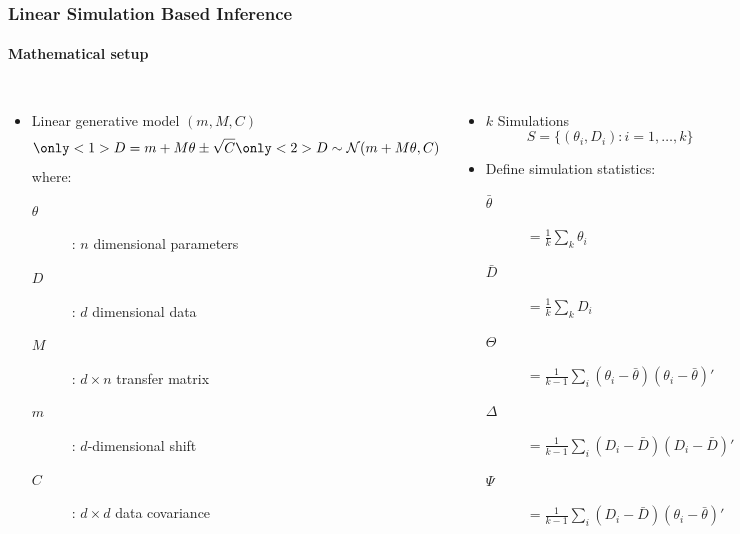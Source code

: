 \documentclass[aspectratio=169]{beamer}
\begin{document}
\begin{frame}
    \frametitle{Linear Simulation Based Inference}
    \framesubtitle{Mathematical setup}
    \begin{columns}[t]
        \begin{itemize}
            \item Linear generative model $(m,M,C)$
                \[ 
                    \only<1>{D = m + M \theta \pm \sqrt{C}}%
                    \only<2>{D \sim \mathcal{N}(m + M \theta, C)}%
                \]%
                where:
                \begin{description}
                    \item[$\theta$]: $n$ dimensional parameters
                    \item[$D$]: $d$ dimensional data
                    \item[$M$]: $d\times n$ transfer matrix
                    \item[$m$]: $d$-dimensional shift
                    \item[$C$]:  $d\times d$ data covariance
                \end{description}
        \end{itemize}

        \pause
        \begin{itemize}
            \item $k$ Simulations 
                \[
                    S=\{ (\theta_i,D_i): i=1,\ldots,k\}
                \]
            \item Define simulation statistics\footnotemark:

                \begin{description}
                    \item[$\bar\theta$] $= \tfrac{1}{k}\sum_k \theta_i$
                    \item[$\bar D$] $= \tfrac{1}{k}\sum_k D_i$
                    \item[$\Theta$] $=\tfrac{1}{k-1}\sum_i (\theta_i-\bar\theta)(\theta_i-\bar\theta)'$
                    \item[$\Delta$] $=\tfrac{1}{k-1}\sum_i (D_i-\bar D)(D_i-\bar D)'$
                    \item[$\Psi$] $=\tfrac{1}{k-1}\sum_i (D_i-\bar D)(\theta_i-\bar \theta)'$
                \end{description}
        \end{itemize}
    \end{columns}
\end{frame}
\end{document}
